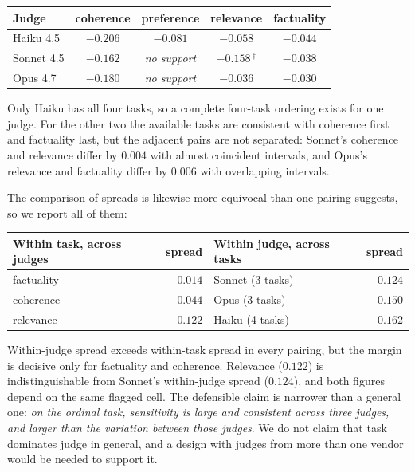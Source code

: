 \begin{center}
\begin{tabular}{lcccc}
\toprule
Judge & coherence & preference & relevance & factuality \\
\midrule
Haiku 4.5   & $-0.206$ & $-0.081$          & $-0.058$          & $-0.044$ \\
Sonnet 4.5  & $-0.162$ & \emph{no support} & $-0.158$\,$^{\dagger}$ & $-0.038$ \\
Opus 4.7    & $-0.180$ & \emph{no support} & $-0.036$          & $-0.030$ \\
\bottomrule
\end{tabular}
\end{center}


Only Haiku has all four tasks, so a complete four-task ordering exists for one
judge. For the other two the available tasks are consistent with coherence
first and factuality last, but the adjacent pairs are not separated: Sonnet's
coherence and relevance differ by $0.004$ with almost coincident intervals, and
Opus's relevance and factuality differ by $0.006$ with overlapping intervals.

The comparison of spreads is likewise more equivocal than one pairing suggests,
so we report all of them:

\begin{center}
\begin{tabular}{lrlr}
\toprule
Within task, across judges & spread & Within judge, across tasks & spread \\
\midrule
factuality & $0.014$ & Sonnet (3 tasks) & $0.124$ \\
coherence  & $0.044$ & Opus (3 tasks)   & $0.150$ \\
relevance  & $0.122$ & Haiku (4 tasks)  & $0.162$ \\
\bottomrule
\end{tabular}
\end{center}

Within-judge spread exceeds within-task spread in every pairing, but the margin
is decisive only for factuality and coherence. Relevance ($0.122$) is
indistinguishable from Sonnet's within-judge spread ($0.124$), and both figures
depend on the same flagged cell. The defensible claim is narrower than a general
one: \emph{on the ordinal task, sensitivity is large and consistent across three
judges, and larger than the variation between those judges}. We do not claim
that task dominates judge in general, and a design with judges from more than one
vendor would be needed to support it.

